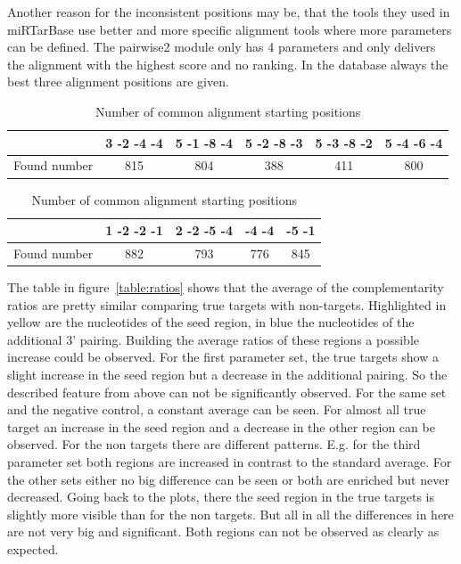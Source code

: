 \documentclass[12pt]{article}
\begin{document}
Another reason for the inconsistent positions may be, that the tools they used in miRTarBase use better and more specific alignment tools where more parameters can be defined. The pairwise2 module only has 4 parameters and only delivers the alignment with the highest score and no ranking. In the database always the best three alignment positions are given.  \\


\begin{table}
\caption{Number of common alignment starting positions}
\vspace{0.3cm}
\begin{tabular}{c||c|c|c|c|c} 
& 3 -2 -4 -4 & 5 -1 -8 -4 & 5 -2 -8 -3 & 5 -3 -8 -2 & 5 -4 -6 -4  \\
\hline\hline
Found number & 815 & 804 & 388 & 411 & 800\\
\hline
\end{tabular}
\vspace{0.5cm}

\begin{tabular}{c||c|c|c|c}
& 1 -2 -2 -1 & 2 -2 -5 -4 & -4 -4 & -5 -1 \\
\hline\hline
Found number & 882 & 793 & 776 & 845  \\
\hline
\end{tabular}
\label{tab:positions}
\end{table}


The table in figure~\ref{table:ratios} shows that the average of the complementarity ratios are pretty similar comparing true targets with non-targets. Highlighted in yellow are the nucleotides of the seed region, in blue the nucleotides of the additional 3' pairing. Building the average ratios of these regions a possible increase could be observed. For the first parameter set, the true targets show a slight increase in the seed region but a decrease in the additional pairing. So the described feature from above can not be significantly observed. For the same set and the negative control, a constant average can be seen. For almost all true target an increase in the seed region and a decrease in the other region can be observed. For the non targets there are different patterns. E.g. for the third parameter set both regions are increased in contrast to the standard average. For the other sets either no big difference can be seen or both are enriched but never decreased. Going back to the plots, there the seed region in the true targets is slightly more visible than for the non targets. But all in all the differences in here are not very big and significant. Both regions can not be observed as clearly as expected.  
\end{document}
